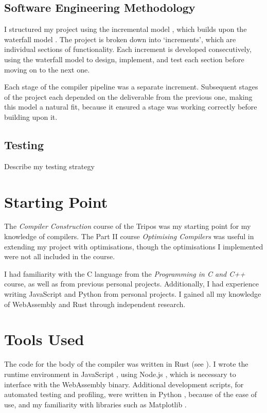 \documentclass[00-main.tex]{subfiles}
\begin{document}
\subsection{Software Engineering Methodology}

I structured my project using the incremental model , which builds upon the waterfall model .
The project is broken down into `increments', which are individual sections of functionality.
Each increment is developed consecutively, using the waterfall model to design, implement, and test each section before moving on to the next one.

Each stage of the compiler pipeline was a separate increment.
Subsequent stages of the project each depended on the deliverable from the previous one, making this model a natural fit, because it ensured a stage was working correctly before building upon it.

\subsection{Testing}

\begin{mrwComment}
Describe my testing strategy
\end{mrwComment}

\section{Starting Point}

The \emph{Compiler Construction} course of the Tripos was my starting point for my knowledge of compilers.
The Part II course \emph{Optimising Compilers} was useful in extending my project with optimisations, though the optimisations I implemented were not all included in the course.

I had familiarity with the C language from the \emph{Programming in C and C++} course, as well as from previous personal projects.
Additionally, I had experience writing JavaScript and Python from personal projects.
I gained all my knowledge of WebAssembly and Rust through independent research.

\section{Tools Used}

The code for the body of the compiler was written in Rust (see ).
I wrote the runtime environment in JavaScript , using Node.js , which is necessary to interface with the Web\-Assembly binary.
Additional development scripts, for automated testing and profiling, were written in Python , because of the ease of use, and my familiarity with libraries such as Matplotlib .
\end{document}
